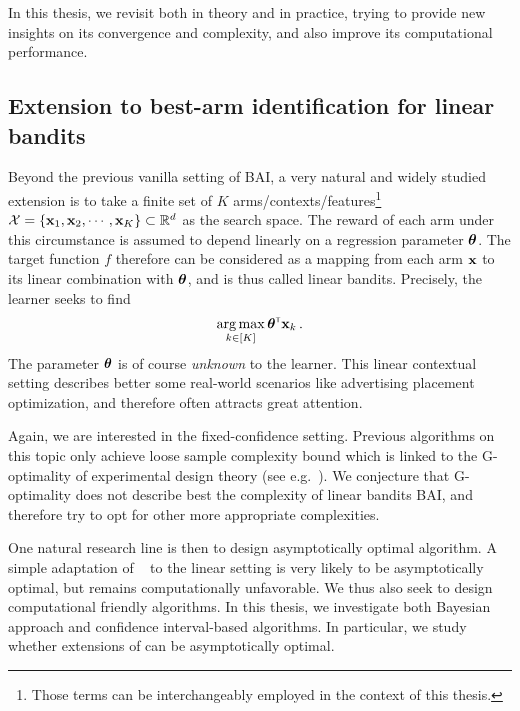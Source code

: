 In this thesis, we revisit \TTTS both in theory and in practice, trying to provide new insights on its convergence and complexity, and also improve its computational performance.

\subsection{Extension to best-arm identification for linear bandits}\label{sec:intro.mab.linear}

Beyond the previous vanilla setting of BAI, a very natural and widely studied extension is to take a finite set of $K$ arms/contexts/features\footnote{Those terms can be interchangeably employed in the context of this thesis.} $\mathcal{X}=\{{\bf x}_1,{\bf x}_2,\cdots,{\bf x}_K\}\subset\mathbb{R}^d$ as the search space. The reward of each arm under this circumstance is assumed to depend linearly on a \gls{regression parameter} ${\boldsymbol \theta}$. The target function $f$ therefore can be considered as a mapping from each arm ${\bf x}$ to its linear combination with ${\boldsymbol \theta}$, and is thus called linear bandits. Precisely, the learner seeks to find
\begin{align}\label{eq:optim_linbai}
    \operatorname*{arg\,max}_{k\in[K]} {\boldsymbol \theta}^{\mathsf{\scriptscriptstyle T}}{\bf x}_k\,.
\end{align}
The parameter ${\boldsymbol \theta}$ is of course \emph{unknown} to the learner. This linear contextual setting describes better some real-world scenarios like advertising placement optimization, and therefore often attracts great attention.

Again, we are interested in the fixed-confidence setting. Previous algorithms on this topic only achieve loose sample complexity bound which is linked to the \gls{G-optimality} of experimental design theory (see e.g.~\citealt{pukelsheim2006optimal}). We conjecture that G-optimality does not describe best the complexity of linear bandits BAI, and therefore try to opt for other more appropriate complexities.

One natural research line is then to design asymptotically optimal algorithm. A simple adaptation of \Track~\citep{garivier2016tracknstop} to the linear setting is very likely to be asymptotically optimal, but remains computationally unfavorable. We thus also seek to design computational friendly algorithms. In this thesis, we investigate both Bayesian approach and confidence interval-based algorithms. In particular, we study whether extensions of \TTTS can be asymptotically optimal.

